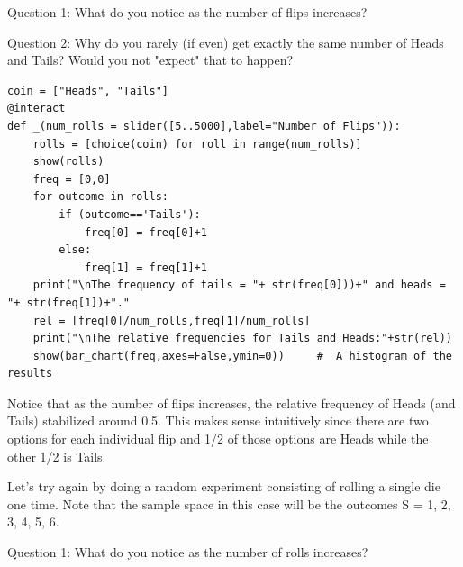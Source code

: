 \documentclass[10pt,]{book}
\theoremstyle{plain}
\theoremstyle{definition}
\theoremstyle{definition}
\theoremstyle{definition}
\numberwithin{equation}{section}
\begin{document}
	Question 1: What do you notice as the number of flips increases?
\par

	Question 2: Why do you rarely (if even) get exactly the same number of Heads and Tails? Would you not "expect"
	that to happen?
\begin{lstlisting}[style=sageinput]
coin = ["Heads", "Tails"]
@interact
def _(num_rolls = slider([5..5000],label="Number of Flips")):
	rolls = [choice(coin) for roll in range(num_rolls)]
	show(rolls)   
	freq = [0,0]
	for outcome in rolls:
		if (outcome=='Tails'):
			freq[0] = freq[0]+1
		else:
			freq[1] = freq[1]+1
	print("\nThe frequency of tails = "+ str(freq[0]))+" and heads = "+ str(freq[1])+"."
	rel = [freq[0]/num_rolls,freq[1]/num_rolls]
	print("\nThe relative frequencies for Tails and Heads:"+str(rel))
	show(bar_chart(freq,axes=False,ymin=0))     #  A histogram of the results
\end{lstlisting}
\par
Notice that as the number of flips increases, the relative frequency of Heads (and Tails)
	stabilized around 0.5. This makes sense intuitively since there are two options for each 
	individual flip and 1/2 of those options are Heads while the other 1/2 is Tails.%
\par

	Let's try again
	by doing a random experiment consisting of rolling a single die one time. Note that the sample space 
	in this case will be the outcomes S = {1, 2, 3, 4, 5, 6}.
\par

	Question 1: What do you notice as the number of rolls increases?
\par
\end{document}
